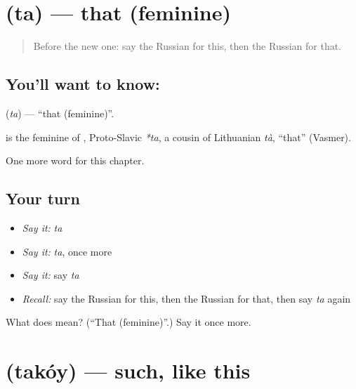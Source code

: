 \section[\texorpdfstring{\ru{та} (ta)}{та (ta)}]{ (ta) — that (feminine)}

\label{lesson:RU-C82-that-2}



\begin{quote}
Before the new one: say the Russian for this, then the Russian for that.
\end{quote}

\subsection*{You'll want to know: }
\textbf{} (\emph{ta}) — \textquotedblleft{}that (feminine)\textquotedblright{}.

\begin{cousinweb}
\textbf{} is the feminine of \emph{}, Proto-Slavic \emph{*ta}, a cousin of Lithuanian \emph{tà}, \textquotedblleft{}that\textquotedblright{} (Vasmer).
\end{cousinweb}

\begin{grammarlens}[title={What you've built}]
One more word for this chapter.
\end{grammarlens}

\subsection*{Your turn}
\begin{itemize}
\raggedright
  \item \emph{Say it:} \emph{ta}
  \item \emph{Say it:} \emph{ta}, once more
  \item \emph{Say it:} say \emph{ta}
  \item \emph{Recall:} say the Russian for this, then the Russian for that, then say \emph{ta} again
\end{itemize}

\begin{tcolorbox}[breakable,colback=teal!4,colframe=teal!35!black,title={Before you move on}]
What does  mean? (\textquotedblleft{}That (feminine)\textquotedblright{}.) Say it once more.
\end{tcolorbox}
\section[\texorpdfstring{\ru{такой} (takóy)}{такой (takóy)}]{ (takóy) — such, like this}

